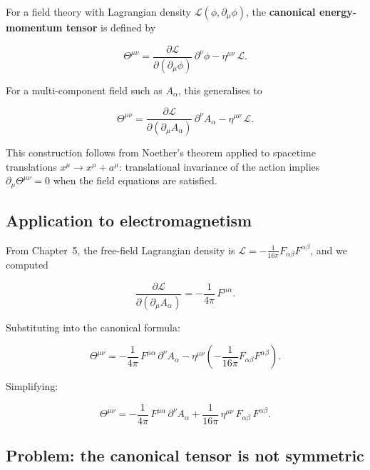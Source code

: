 For a field theory with Lagrangian density $\mathcal{L}(\phi, \partial_\mu\phi)$, the \textbf{canonical energy-momentum tensor} is defined by

\begin{equation}
\Theta^{\mu\nu} = \frac{\partial\mathcal{L}}{\partial(\partial_\mu\phi)}\,\partial^\nu\phi - \eta^{\mu\nu}\,\mathcal{L}.
\end{equation}

For a multi-component field such as $A_\alpha$, this generalises to

\begin{equation}
\Theta^{\mu\nu} = \frac{\partial\mathcal{L}}{\partial(\partial_\mu A_\alpha)}\,\partial^\nu A_\alpha - \eta^{\mu\nu}\,\mathcal{L}.
\end{equation}

This construction follows from Noether's theorem applied to spacetime translations $x^\mu \to x^\mu + a^\mu$: translational invariance of the action implies $\partial_\mu\Theta^{\mu\nu} = 0$ when the field equations are satisfied.

\subsection{Application to electromagnetism}

From Chapter~5, the free-field Lagrangian density is $\mathcal{L} = -\frac{1}{16\pi}F_{\alpha\beta}F^{\alpha\beta}$, and we computed

\begin{equation}
\frac{\partial\mathcal{L}}{\partial(\partial_\mu A_\alpha)} = -\frac{1}{4\pi}\,F^{\mu\alpha}.
\end{equation}

Substituting into the canonical formula:

\begin{equation}
\Theta^{\mu\nu} = -\frac{1}{4\pi}\,F^{\mu\alpha}\,\partial^\nu A_\alpha - \eta^{\mu\nu}\!\left(-\frac{1}{16\pi}F_{\alpha\beta}F^{\alpha\beta}\right).
\end{equation}

Simplifying:

\begin{equation}
\Theta^{\mu\nu} = -\frac{1}{4\pi}\,F^{\mu\alpha}\,\partial^\nu A_\alpha + \frac{1}{16\pi}\,\eta^{\mu\nu}\,F_{\alpha\beta}\,F^{\alpha\beta}.
\end{equation}

\subsection{Problem: the canonical tensor is not symmetric}

